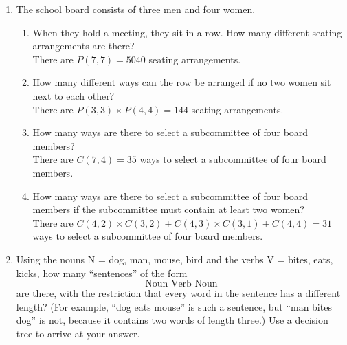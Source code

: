 \documentclass[10pt]{article}
\begin{document}
\begin{enumerate}
  \item The school board consists of three men and four women.
  \begin{enumerate}
    \item When they hold a meeting, they sit in a row. How many different seating arrangements are there?\\
    There are $P(7,7) = 5040$ seating arrangements.
    \item How many different ways can the row be arranged if no two women sit next to each other?\\
    There are $P(3,3) \times P(4,4) = 144$ seating arrangements.
    \item How many ways are there to select a subcommittee of four board members?\\
    There are $C(7,4) = 35$ ways to select a subcommittee of four board members.
    \item How many ways are there to select a subcommittee of four board members if the subcommittee must contain at least two women?\\
    There are $C(4,2) \times C(3,2) + C(4,3) \times C(3,1) + C(4,4) = 31$ ways to select a subcommittee of four board members.
  \end{enumerate}

\setcounter{enumi}{15}

  \item Using the nouns N = {dog, man, mouse, bird} and the verbs V = {bites, eats, kicks}, how many “sentences” of the form
  \[\text{Noun      Verb      Noun}\]
  are there, with the restriction that every word in the sentence has a different length? (For example, “dog eats mouse” is such a sentence, but “man bites dog” is not, because it contains two words of length three.) Use a decision tree to arrive at your answer.\\
\end{enumerate}
\end{document}
